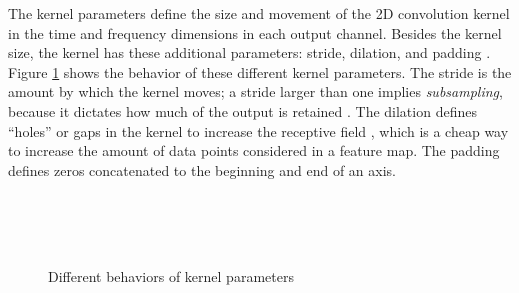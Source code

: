 \documentclass[report.tex]{subfiles}
\begin{document}
The kernel parameters define the size and movement of the 2D convolution kernel in the time and frequency dimensions in each output channel. Besides the kernel size, the kernel has these additional parameters: stride, dilation, and padding \parencite{convguide}. Figure \ref{fig:convdiags} shows the behavior of these different kernel parameters. The stride is the amount by which the kernel moves; a stride larger than one implies \textit{subsampling}, because it dictates how much of the output is retained \parencite{convguide}. The dilation defines ``holes'' or gaps in the kernel to increase the receptive field \parencite{convguide}, which is a cheap way to increase the amount of data points considered in a feature map. The padding defines zeros concatenated to the beginning and end of an axis.

\begin{figure}[ht]
	\centering
	\\
	\\
	\\
	\caption{Different behaviors of kernel parameters \parencite[14, 29]{convguide}}
	\label{fig:convdiags}
\end{figure}
\end{document}
